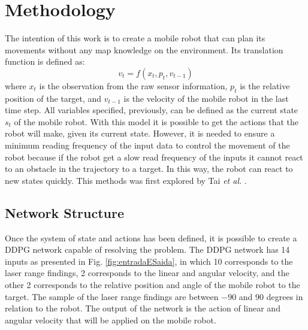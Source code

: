 \section*{Methodology}

The intention of this work is to create a mobile robot that can plan its movements without any map knowledge on the environment. Its translation function is defined as:
\begin{equation}
v_t = f(x_t, p_t, v_{t-1})
\end{equation}
where $x_t$ is the observation from the raw sensor information, $p_t$ is the relative position of the target, and $v_{t-1}$ is the velocity of the mobile robot in the last time step.
All variables specified, previously, can be defined as the current state $s_t$ of the mobile robot.
With this model it is possible to get the actions that the robot will make, given its current state.
However, it is needed to ensure a minimum reading frequency of the input data to control the movement of the robot because if the robot get a slow read frequency of the inputs it cannot react to an obstacle in the trajectory to a target. In this way, the robot can react to new states quickly.
This methods was first explored by Tai \textit{et al.} \cite{tai2017virtual}.

\subsection*{Network Structure}

Once the system of state and actions has been defined, it is possible to create a DDPG network capable of resolving the problem.
The DDPG network has 14 inputs as presented in Fig. \ref{fig:entradaESaida}, in which 10 corresponds to the laser range findings, 2 corresponds to the linear and angular velocity, and the other 2 corresponds to the relative position and angle of the mobile robot to the target.
The sample of the laser range findings are between $-90$ and $90$ degrees in relation to the robot. The output of the network is the action of linear and angular velocity that will be applied on the mobile robot.

